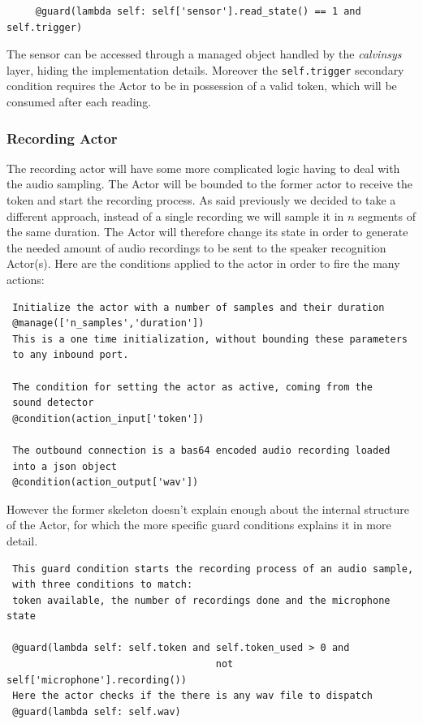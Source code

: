 \begin{verbatim}
     @guard(lambda self: self['sensor'].read_state() == 1 and self.trigger)
 \end{verbatim}
 The sensor can be accessed through a managed object handled by the \textit{calvinsys}
 layer, hiding the implementation details. Moreover the \texttt{self.trigger} secondary
 condition requires the Actor to be in possession of a valid token, which will be consumed
 after each reading.

 \subsubsection{Recording Actor}

 The recording actor will have some more complicated logic having to deal with
 the audio sampling. The Actor will be bounded to the former actor to receive
 the token and start the recording process. As said previously we decided to
 take a different approach, instead of a single recording we will sample it in
 $n$ segments of the same duration. The Actor will therefore change its state
 in order to generate the needed amount of audio recordings to be sent to the
 speaker recognition Actor(s).\newline
 Here are the conditions applied to the actor in order to fire the many actions:

 \begin{verbatim}
 Initialize the actor with a number of samples and their duration
 @manage(['n_samples','duration'])
 This is a one time initialization, without bounding these parameters
 to any inbound port.

 The condition for setting the actor as active, coming from the
 sound detector
 @condition(action_input['token'])

 The outbound connection is a bas64 encoded audio recording loaded
 into a json object
 @condition(action_output['wav'])
 \end{verbatim}

 However the former skeleton doesn't explain enough about the internal structure of the Actor,
 for which the more specific guard conditions explains it in more detail.

 \begin{verbatim}
 This guard condition starts the recording process of an audio sample,
 with three conditions to match:
 token available, the number of recordings done and the microphone state

 @guard(lambda self: self.token and self.token_used > 0 and
                                    not self['microphone'].recording())
 Here the actor checks if the there is any wav file to dispatch
 @guard(lambda self: self.wav)
 \end{verbatim}

